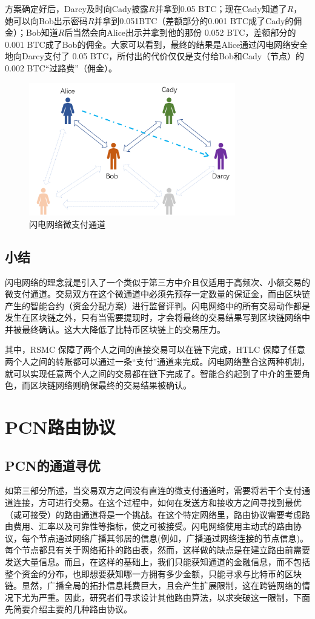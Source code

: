 \documentclass[12pt,a4paper]{article}
\begin{document}
方案确定好后，Darcy及时向Cady披露$R$并拿到0.05 BTC；现在Cady知道了$R$，她可以向Bob出示密码$R$并拿到0.051BTC（差额部分的0.001 BTC成了Cady的佣金）；Bob知道$R$后当然会向Alice出示并拿到他的那份 0.052 BTC，差额部分的 0.001 BTC成了Bob的佣金。大家可以看到，最终的结果是Alice通过闪电网络安全地向Darcy支付了 0.05 BTC，所付出的代价仅仅是支付给Bob和Cady（节点）的 0.002 BTC“过路费”（佣金）。

\begin{figure}[htb]
\centering
\includegraphics[width=9cm]{channels}
\caption{闪电网络微支付通道}
\end{figure}

\subsection{小结}
闪电网络的理念就是引入了一个类似于第三方中介且仅适用于高频次、小额交易的微支付通道。交易双方在这个微通道中必须先预存一定数量的保证金，而由区块链产生的智能合约（资金分配方案）进行监督评判。闪电网络中的所有交易动作都是发生在区块链之外，只有当需要提现时，才会将最终的交易结果写到区块链网络中并被最终确认。这大大降低了比特币区块链上的交易压力。

其中，RSMC 保障了两个人之间的直接交易可以在链下完成，HTLC 保障了任意两个人之间的转账都可以通过一条“支付”通道来完成。闪电网络整合这两种机制，就可以实现任意两个人之间的交易都在链下完成了。智能合约起到了中介的重要角色，而区块链网络则确保最终的交易结果被确认。

\section{PCN路由协议}

\subsection{PCN的通道寻优}
如第三部分所述，当交易双方之间没有直连的微支付通道时，需要将若干个支付通道连接，方可进行交易。在这个过程中，如何在发送方和接收方之间寻找到最优（或可接受）的路由通道将是一个挑战。在这个特定网络里，路由协议需要考虑路由费用、汇率以及可靠性等指标，使之可被接受。闪电网络使用主动式的路由协议，每个节点通过网络广播其邻居的信息(例如，广播通过网络连接的节点信息)。每个节点都具有关于网络拓扑的路由表，然而，这样做的缺点是在建立路由前需要发送大量信息。而且，在这样的基础上，我们只能获知通道的金融信息，而不包括整个资金的分布，也即想要获知哪一方拥有多少金额，只能寻求与比特币的区块链。显然，广播全局的拓扑信息耗费巨大，且会产生扩展限制，这在跨链网络的情况下尤为严重。因此，研究者们寻求设计其他路由算法，以求突破这一限制，下面先简要介绍主要的几种路由协议。
\end{document}
